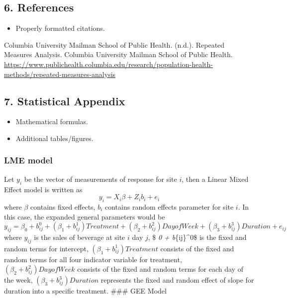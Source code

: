 \documentclass[
]{article}
\providecommand{\tightlist}{%
  \setlength{\itemsep}{0pt}\setlength{\parskip}{0pt}}
\begin{document}
\hypertarget{references}{%
\subsection{6. References}\label{references}}

\begin{itemize}
\tightlist
\item
  Properly formatted citations.
\end{itemize}

Columbia University Mailman School of Public Health. (n.d.). Repeated
Measures Analysis. Columbia University Mailman School of Public Health.
\url{https://www.publichealth.columbia.edu/research/population-health-methods/repeated-measures-analysis}

\hypertarget{statistical-appendix}{%
\subsection{7. Statistical Appendix}\label{statistical-appendix}}

\begin{itemize}
\tightlist
\item
  Mathematical formulas.
\item
  Additional tables/figures.
\end{itemize}

\hypertarget{lme-model}{%
\subsubsection{LME model}\label{lme-model}}

Let \(y_i\) be the vector of measurements of response for site \(i\),
then a Linear Mixed Effect model is written as
\[y_i = X_i\beta + Z_i b_i + e_i\] where \(\beta\) contains fixed
effects, \(b_i\) contains random effects parameter for site \(i\). In
this case, the expanded general parameters would be
\[y_{ij}  = \beta_0 + b_{ij}^0 + (\beta_1 + b_{ij}^1)Treatment + (\beta_2 + b_{ij}^2)Day of Week +(\beta_3 + b_{ij}^3)Duration +e_{ij}\]
where \(y_{ij}\) is the sales of beverage at site \(i\) day \(j\), \$
\beta\emph{0 + b}\{ij\}\^{}0\$ is the fixed and random terms for
intercept, \((\beta_1 + b_{ij}^1)Treatment\) consists of the fixed and
random terms for all four indicator variable for treatment,
\((\beta_2 + b_{ij}^2)Day of Week\) consists of the fixed and random
terms for each day of the week, \((\beta_3 + b_{ij}^3)Duration\)
represents the fixed and random effect of slope for duration into a
specific treatment. \#\#\# GEE Model
\end{document}
